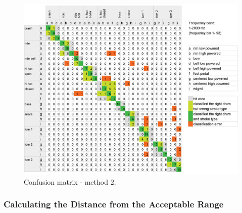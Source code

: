 \begin{figure}[htb]
	\centering
	\includegraphics[width=\textwidth]{images/classification_matrix/matrix_test_2.png}
	\caption{Confusion matrix - method 2.}
	\label{fig:matrix2}
\end{figure}





\newpage
\subsubsection{Calculating the Distance from the Acceptable Range}
\label{section:shapeComparisonClassification3}

